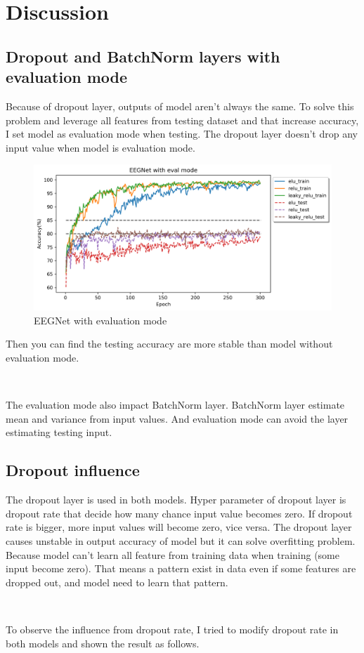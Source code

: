 \documentclass[12pt]{article}
\begin{document}
\section{Discussion}

\subsection{Dropout and BatchNorm layers with evaluation mode}

Because of dropout layer, outputs of model aren't always the same. To solve this problem and leverage all features from testing dataset and that increase accuracy, I set model as evaluation mode when testing. The dropout layer doesn't drop any input value when model is evaluation mode.

\begin{figure}[H]
\centering
\includegraphics[width=\linewidth]{Images/EEGNetWithEvalMode.png}
\caption{EEGNet with evaluation mode}
\end{figure}

Then you can find the testing accuracy are more stable than model without evaluation mode.
\par \ \par
The evaluation mode also impact BatchNorm layer. BatchNorm layer estimate mean and variance from input values. And evaluation mode can avoid the layer estimating testing input.

\subsection{Dropout influence}

The dropout layer is used in both models.  Hyper parameter of dropout layer is  dropout rate that decide how many chance input value becomes zero. If dropout rate is bigger, more input values will become zero, vice versa. The dropout layer causes unstable in output accuracy of model but it can solve overfitting problem. Because model can't learn all feature from training data when training (some input become zero). That means a pattern exist in data even if some features are dropped out, and model need to learn that pattern.
\par \ \par
To observe the influence from dropout rate, I tried to modify dropout rate in both models and shown the 
result as follows.
\end{document}
